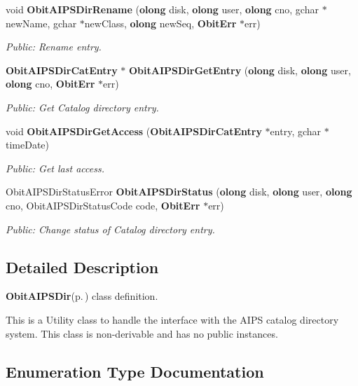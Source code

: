 \begin{CompactItemize}
void {\bf Obit\-AIPSDir\-Rename} ({\bf olong} disk, {\bf olong} user, {\bf olong} cno, gchar $\ast$new\-Name, gchar $\ast$new\-Class, {\bf olong} new\-Seq, {\bf Obit\-Err} $\ast$err)
\begin{CompactList}\small\item\em Public: Rename entry. \item\end{CompactList}\item 
{\bf Obit\-AIPSDir\-Cat\-Entry} $\ast$ {\bf Obit\-AIPSDir\-Get\-Entry} ({\bf olong} disk, {\bf olong} user, {\bf olong} cno, {\bf Obit\-Err} $\ast$err)
\begin{CompactList}\small\item\em Public: Get Catalog directory entry. \item\end{CompactList}\item 
void {\bf Obit\-AIPSDir\-Get\-Access} ({\bf Obit\-AIPSDir\-Cat\-Entry} $\ast$entry, gchar $\ast$time\-Date)
\begin{CompactList}\small\item\em Public: Get last access. \item\end{CompactList}\item 
Obit\-AIPSDir\-Status\-Error {\bf Obit\-AIPSDir\-Status} ({\bf olong} disk, {\bf olong} user, {\bf olong} cno, Obit\-AIPSDir\-Status\-Code code, {\bf Obit\-Err} $\ast$err)
\begin{CompactList}\small\item\em Public: Change status of Catalog directory entry. \item\end{CompactList}\end{CompactItemize}


\subsection{Detailed Description}
{\bf Obit\-AIPSDir}{\rm (p.\,\pageref{structObitAIPSDir})} class definition. 

This is a Utility class to handle the interface with the AIPS catalog directory system. This class is non-derivable and has no public instances.

\subsection{Enumeration Type Documentation}
